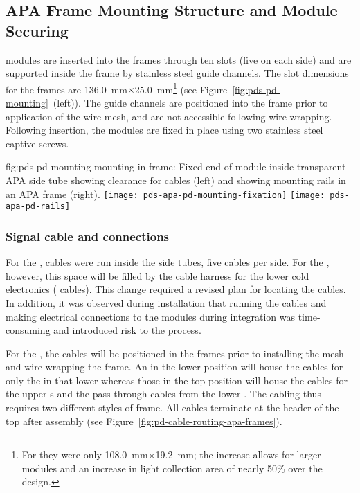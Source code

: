 \subsection{APA Frame Mounting Structure and Module Securing}	
\label{sec:fdsp-pd-assy-frames}

 modules are inserted into the  frames through ten slots (five on each side) and are supported inside the frame by stainless steel guide channels.  The slot dimensions for the   frames 
are \SI{136.0}{mm}$\times$\SI{25.0}{mm}\footnote{For  they were only \SI{108.0}{mm}$\times$\SI{19.2}{mm}; the increase allows for larger  modules and an increase in light collection area of nearly 50\% over the  design.}   
(see Figure~\ref{fig:pds-pd-mounting}~(left)).
The guide channels are positioned into the  frame prior to application of the wire mesh, and are not accessible following wire wrapping. Following insertion, the  modules are fixed in place using two stainless steel captive screws.

\begin{dunefigure}{fig:pds-pd-mounting}
{ mounting in  frame: Fixed end of   module inside transparent APA side tube showing clearance for  cables (left) and showing  mounting rails in an APA frame  (right).}
	\texttt{[image: pds-apa-pd-mounting-fixation]}
	\texttt{[image: pds-apa-pd-rails]}
\end{dunefigure}

\subsubsection{Signal cable and connections}

For the ,  cables were run inside the  side tubes, five cables per side.  For the , however, this space will be filled by the cable harness for the lower  cold electronics ( cables).  This change required a revised plan for locating the  cables.  In addition, it was observed during   installation that running the  cables and making electrical connections to the modules during  integration was time-consuming and introduced risk to the process.

For the , the  cables will be %
positioned in the  frames prior to installing the %
mesh and wire-wrapping the frame.  
An  in the lower position will house the cables for only the  in that lower  whereas those in the top position will house the cables for the upper  s and the pass-through cables from the lower . The cabling thus requires two different styles of  frame. All cables terminate at the header of the top  after assembly (see Figure~\ref{fig:pd-cable-routing-apa-frames}).

